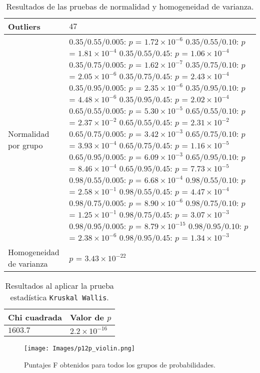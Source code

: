 \documentclass{report}
\begin{document}
\begin{table}[ht]
\centering
\caption{Resultados de las pruebas de normalidad y homogeneidad de varianza.}
\smallskip

\begin{tabular}{ |p{2.1cm}|p{5cm}|}
 \hline
 Outliers & $47$ \\
 \hline
 Normalidad por grupo & $0.35/0.55/0.005$: $p$ = $1.72\times 10^{-6}$ $0.35/0.55/0.10$: $p$ = $1.81\times 10^{-4}$ $0.35/0.55/0.45$: $p$ = $1.06\times 10^{-4}$ $0.35/0.75/0.005$: $p$ = $1.62\times 10^{-7}$ $0.35/0.75/0.10$: $p$ = $2.05\times 10^{-6}$ $0.35/0.75/0.45$: $p$ = $2.43\times 10^{-4}$ $0.35/0.95/0.005$: $p$ = $2.35\times 10^{-6}$ $0.35/0.95/0.10$: $p$ = $4.48\times 10^{-6}$ $0.35/0.95/0.45$: $p$ = $2.02\times 10^{-4}$ $0.65/0.55/0.005$: $p$ = $5.30\times 10^{-5}$ $0.65/0.55/0.10$: $p$ = $2.37\times 10^{-2}$ $0.65/0.55/0.45$: $p$ = $2.31\times 10^{-2}$ $0.65/0.75/0.005$: $p$ = $3.42\times 10^{-3}$ $0.65/0.75/0.10$: $p$ = $3.93\times 10^{-4}$ $0.65/0.75/0.45$: $p$ = $1.16\times 10^{-5}$ $0.65/0.95/0.005$: $p$ = $6.09\times 10^{-3}$ $0.65/0.95/0.10$: $p$ = $8.46\times 10^{-4}$ $0.65/0.95/0.45$: $p$ = $7.73\times 10^{-5}$ $0.98/0.55/0.005$: $p$ = $6.68\times 10^{-4}$ $0.98/0.55/0.10$: $p$ = $2.58\times 10^{-1}$ $0.98/0.55/0.45$: $p$ = $4.47\times 10^{-4}$ $0.98/0.75/0.005$: $p$ = $8.90\times 10^{-6}$ $0.98/0.75/0.10$: $p$ = $1.25\times 10^{-1}$ $0.98/0.75/0.45$: $p$ = $3.07\times 10^{-3}$ $0.98/0.95/0.005$: $p$ = $8.79\times 10^{-15}$ $0.98/0.95/0.10$: $p$ = $2.38\times 10^{-6}$ $0.98/0.95/0.45$: $p$ = $1.34\times 10^{-3}$\\
 \hline
 Homogeneidad de varianza & $p$ = $3.43\times 10^{-22}$ \\
 \hline
\end{tabular}
\label{cuadro1}
\end{table}

\begin{table}[ht!]
\centering
\caption{Resultados al aplicar la prueba estadística \texttt{Kruskal Wallis}.}
\smallskip

\begin{tabular}{ |p{2.1cm}|p{2.1cm}|}
 \hline
 Chi cuadrada & Valor de $p$ \\
 \hline
 $1603.7$ & $2.2\times 10^{-16}$ \\
 \hline
\end{tabular}
\label{cuadro2}
\end{table}

\begin{figure}
    \centering
    \texttt{[image: Images/p12p\_violin.png]}
    \caption{Puntajes F obtenidos para todos los grupos de probabilidades.}
    \label{fig2}
\end{figure}
\end{document}
